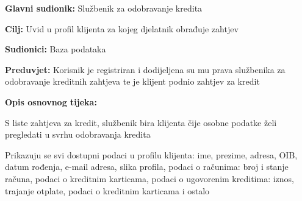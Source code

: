             
                 \noindent {}
                    \begin{packed_item}
                    
                      \item \textbf{Glavni sudionik: } Službenik za odobravanje kredita
                      \item  \textbf{Cilj:} Uvid u profil klijenta za kojeg djelatnik obrađuje zahtjev
                      \item  \textbf{Sudionici:} Baza podataka
                      \item  \textbf{Preduvjet:} Korisnik je registriran i dodijeljena su mu prava službenika za odobravanje kreditnih zahtjeva te je klijent podnio zahtjev za kredit
                      \item  \textbf{Opis osnovnog tijeka:}
                      
                      \item[] \begin{packed_enum}
                    
                    \item S liste zahtjeva za kredit, službenik bira klijenta čije osobne podatke želi pregledati u svrhu odobravanja kredita
                    \item Prikazuju se svi dostupni podaci u profilu klijenta: ime, prezime, adresa, OIB, datum rođenja, e-mail adresa, slika profila, podaci o računima: broj i stanje računa, podaci o kreditnim karticama, podaci o ugovorenim kreditima: iznos, trajanje otplate, podaci o kreditnim karticama i ostalo
                    
                    
                  \end{packed_enum}
                \end{packed_item}
            
